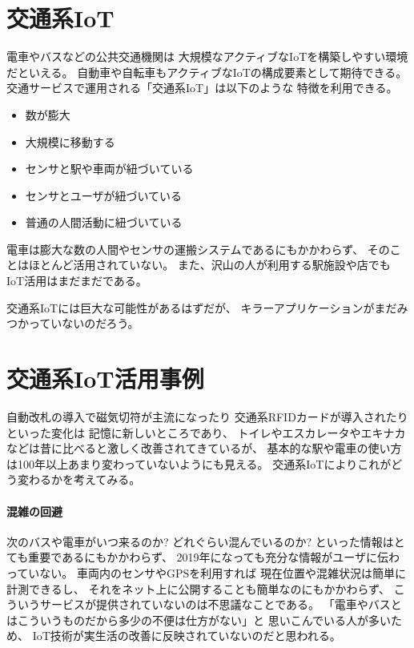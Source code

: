 \documentclass[twocolumn,10pt]{jarticle}
\begin{document}
\section{交通系IoT}
  
電車やバスなどの公共交通機関は
大規模なアクティブなIoTを構築しやすい環境だといえる。
自動車や自転車もアクティブなIoTの構成要素として期待できる。
%
交通サービスで運用される「交通系IoT」は以下のような
特徴を利用できる。

\begin{itemize}
  \setlength{\itemsep}{0cm} %
  \item 数が膨大
  \item 大規模に移動する
  \item センサと駅や車両が紐づいている
  \item センサとユーザが紐づいている
  \item 普通の人間活動に紐づいている
\end{itemize}


電車は膨大な数の人間やセンサの運搬システムであるにもかかわらず、
そのことはほとんど活用されていない。
また、沢山の人が利用する駅施設や店でも
IoT活用はまだまだである。

交通系IoTには巨大な可能性があるはずだが、
キラーアプリケーションがまだみつかっていないのだろう。

% 
% 

\section{交通系IoT活用事例}

自動改札の導入で磁気切符が主流になったり
交通系RFIDカードが導入されたりといった変化は
記憶に新しいところであり、
トイレやエスカレータやエキナカなどは昔に比べると激しく改善されてきているが、
基本的な駅や電車の使い方は100年以上あまり変わっていないようにも見える。
交通系IoTによりこれがどう変わるかを考えてみる。

\paragraph{混雑の回避}

次のバスや電車がいつ来るのか? どれぐらい混んでいるのか?
といった情報はとても重要であるにもかかわらず、
2019年になっても充分な情報がユーザに伝わっていない。
%
車両内のセンサやGPSを利用すれば
現在位置や混雑状況は簡単に計測できるし、
それをネット上に公開することも簡単なのにもかかわらず、
こういうサービスが提供されていないのは不思議なことである。
%
「電車やバスとはこういうものだから多少の不便は仕方がない」と
思いこんでいる人が多いため、
IoT技術が実生活の改善に反映されていないのだと思われる。
\end{document}
